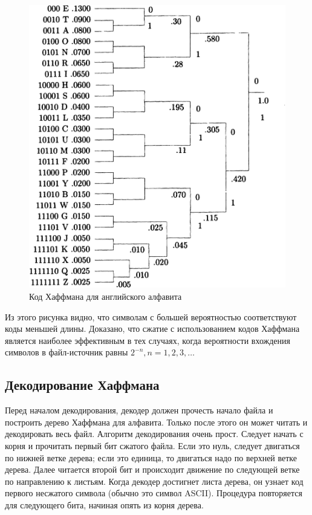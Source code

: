 \begin{figure}[h]
  \centering
  \includegraphics[width=150mm]{pic/huffman_en.jpg}
  \caption{Код Хаффмана для английского алфавита}
  \label{pic:huffman_en}
\end{figure}

Из этого рисунка видно, что символам с большей вероятностью соответствуют
коды меньшей длины. Доказано, что сжатие с использованием кодов Хаффмана
является наиболее эффективным в тех случаях, когда вероятности вхождения символов
в файл-источник равны $ 2^{-n}, n=1,2,3,\dots $ 

\subsection{Декодирование Хаффмана}

Перед началом декодирования, декодер должен прочесть начало 
файла и построить дерево Хаффмана для алфавита.
Только после этого он может читать и декодировать весь файл.
Алгоритм декодирования очень прост.
Следует начать с корня и прочитать первый бит сжатого файла.
Если это нуль, следует двигаться по нижней ветке дерева;
если это единица, то двигаться надо по верхней ветке дерева.
Далее читается второй бит и происходит движение по следующей
ветке по направлению к листьям. Когда декодер достигнет листа
дерева, он узнает код первого несжатого символа 
(обычно это символ ASCII).
Процедура повторяется для следующего бита, начиная опять из корня дерева.

